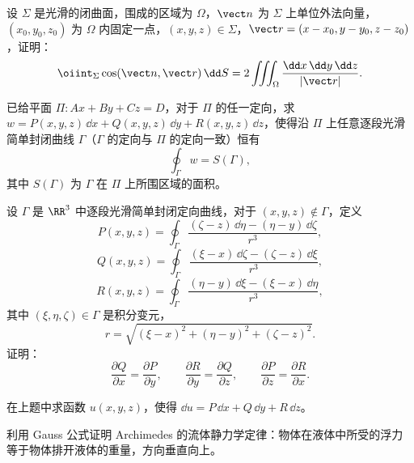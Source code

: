 \begin{xreferenceproblem}[4]
设 $\Sigma$ 是光滑的闭曲面，围成的区域为 $\Omega$，$\vect n$ 为 $\Sigma$ 上单位外法向量，$(x_0,y_0,z_0)$ 为 $\Omega$ 内固定一点，$(x,y,z)\in\Sigma$，$\vect r=(x-x_0,y-y_0,z-z_0)$，证明：
\[
  \oiint_\Sigma\cos(\vect n,\vect r)\,\dd S
  =2\iiint_\Omega\frac{\dd x\,\dd y\,\dd z}{|\vect r|}.
\]
\end{xreferenceproblem}

\begin{xreferenceproblem}[5]
已给平面 $\Pi:Ax+By+Cz=D$，对于 $\Pi$ 的任一定向，求 $w=P(x,y,z)\,\dd x+Q(x,y,z)\,\dd y+R(x,y,z)\,\dd z$，使得沿 $\Pi$ 上任意逐段光滑简单封闭曲线 $\Gamma$（$\Gamma$ 的定向与 $\Pi$ 的定向一致）恒有
\[
  \oint_\Gamma w=S(\Gamma),
\]
其中 $S(\Gamma)$ 为 $\Gamma$ 在 $\Pi$ 上所围区域的面积。
\end{xreferenceproblem}

\begin{xreferenceproblem}[6]
设 $\Gamma$ 是 $\RR^3$ 中逐段光滑简单封闭定向曲线，对于 $(x,y,z)\notin\Gamma$，定义
\[
  P(x,y,z)=\oint_\Gamma\frac{(\zeta-z)\,\dd\eta-(\eta-y)\,\dd\zeta}{r^3},
\]
\[
  Q(x,y,z)=\oint_\Gamma\frac{(\xi-x)\,\dd\zeta-(\zeta-z)\,\dd\xi}{r^3},
\]
\[
  R(x,y,z)=\oint_\Gamma\frac{(\eta-y)\,\dd\xi-(\xi-x)\,\dd\eta}{r^3},
\]
其中 $(\xi,\eta,\zeta)\in\Gamma$ 是积分变元，
\[
  r=\sqrt{(\xi-x)^2+(\eta-y)^2+(\zeta-z)^2}.
\]
证明：
\[
  \frac{\partial Q}{\partial x}=\frac{\partial P}{\partial y},\qquad
  \frac{\partial R}{\partial y}=\frac{\partial Q}{\partial z},\qquad
  \frac{\partial P}{\partial z}=\frac{\partial R}{\partial x}.
\]
\end{xreferenceproblem}

\begin{xreferenceproblem}[7]
在上题中求函数 $u(x,y,z)$，使得 $\dd u=P\,\dd x+Q\,\dd y+R\,\dd z$。
\end{xreferenceproblem}

\begin{xreferenceproblem}[8]
利用 Gauss 公式证明 Archimedes 的流体静力学定律：物体在液体中所受的浮力等于物体排开液体的重量，方向垂直向上。
\end{xreferenceproblem}

